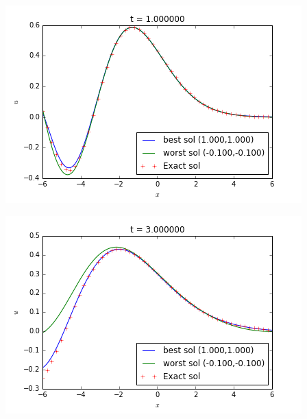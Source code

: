 \noindent\begin{minipage}{\textwidth} 
	\begin{minipage}{.5\textwidth} 
		\includegraphics[scale=.48]{figures/TBCbesse/firstTestsP0Snap2.png}	
	\end{minipage}
	\begin{minipage}{.5\linewidth}
		\includegraphics[scale=.48]{figures/TBCbesse/firstTestsP0Snap4.png}	
	\end{minipage}
\end{minipage}


